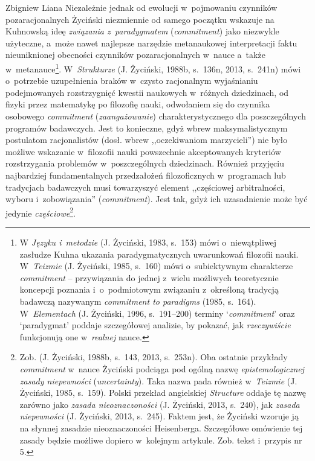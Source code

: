 \begin{artplenv}{Zbigniew Liana}
Niezależnie jednak od ewolucji w~pojmowaniu czynników pozaracjonalnych Życiński niezmiennie od samego początku wskazuje
na Kuhnowską ideę \textit{związania z~paradygmatem }(\textit{commitment}) jako niezwykle użyteczne, a~może nawet najlepsze
narzędzie metanaukowej interpretacji faktu nieuniknionej obecności czynników
pozaracjonalnych w~nauce a~także w~metanauce\footnote{W \textit{Języku i~metodzie} \label{ref:RNDYoSNyQG6OT}(J. Życiński, 1983, s.~153)
mówi o~niewątpliwej
zasłudze Kuhna ukazania paradygmatycznych uwarunkowań filozofii nauki. W~\textit{Teizmie} \label{ref:RNDJ9iyAcBeRp}(J.
Życiński, 1985, s.~160) mówi o~subiektywnym charakterze \textit{commitment} -- przywiązania do jednej z~wielu możliwych
teoretycznie koncepcji poznania i~o~podmiotowym związaniu z~określoną tradycją badawczą nazywanym \textit{commitment to
paradigms} \label{ref:RND7uoHzvi4cv}(1985, s.~164). W~\textit{Elementach} \label{ref:RNDiRufhvdQjS}(J. Życiński, 1996,
s.~191–200) terminy `\textit{commitment}' oraz `paradygmat' poddaje szczegółowej analizie, by pokazać, jak
\textit{rzeczywiście }funkcjonują one w~\textit{realnej} nauce.}. W~\textit{Strukturze }\label{ref:RNDlo3gRg9nYs}(J.
Życiński, 1988b, s.~136n, 2013, s.~241n) mówi o~potrzebie uzupełnienia braków w~czysto racjonalnym wyjaśnianiu
podejmowanych rozstrzygnięć kwestii naukowych w~różnych dziedzinach, od fizyki przez matematykę po filozofię nauki,
odwołaniem się do czynnika osobowego \textit{commitment} (\textit{zaangażowanie}) charakterystycznego dla poszczególnych
programów badawczych. Jest to konieczne, gdyż wbrew maksymalistycznym postulatom racjonalistów (dosł. wbrew
,,oczekiwaniom marzycieli'') nie było możliwe wskazanie w~filozofii nauki powszechnie akceptowanych kryteriów
rozstrzygania problemów w~poszczególnych dziedzinach. Również przyjęciu najbardziej fundamentalnych przedzałożeń
filozoficznych w~programach lub tradycjach badawczych musi towarzyszyć element ,,częściowej arbitralności,
wyboru i~zobowiązania'' (\textit{commitment}).
Jest tak, gdyż ich uzasadnienie może być jedynie \textit{częściowe}\footnote{Zob.
\label{ref:RNDNqJzVjNuqB}(J. Życiński, 1988b, s.~143, 2013, s.~253n). Oba ostatnie przykłady \textit{commitment} w~nauce
Życiński podciąga pod ogólną nazwę \textit{epistemologicznej zasady niepewności }(\textit{uncertainty}). Taka nazwa pada
również w~\textit{Teizmie} \label{ref:RNDTYIhxUDXK4}(J. Życiński, 1985, s.~159). Polski przekład angielskiej
\textit{Structure} oddaje tę nazwę zarówno jako \textit{zasada nieoznaczoności} \label{ref:RNDcZvyKiHaKS}(J. Życiński,
2013, s.~240), jak \textit{zasada niepewności} \label{ref:RNDwSXdH0AKWY}(J. Życiński, 2013, s.~245). Faktem jest, że
Życiński wzoruje ją na słynnej zasadzie nieoznaczoności Heisenberga. Szczegółowe omówienie tej zasady będzie możliwe
dopiero w~kolejnym artykule. Zob. tekst i~przypis nr 5.}.


\end{artplenv}
